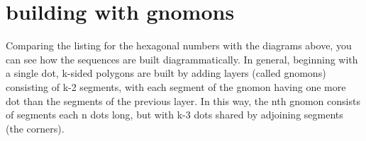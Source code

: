\documentclass[notitlepage]{report}
\begin{document}
\section{building with gnomons}

Comparing the listing for the hexagonal numbers with the diagrams above, you can see how the sequences are built diagrammatically. In general, beginning with a single dot, k-sided polygons are built by adding layers (called gnomons) consisting of k-2 segments, with each segment of the gnomon having one more dot than the segments of the previous layer. In this way, the nth gnomon consists of segments each n dots long, but with k-3 dots shared by adjoining segments (the corners).
\end{document}
